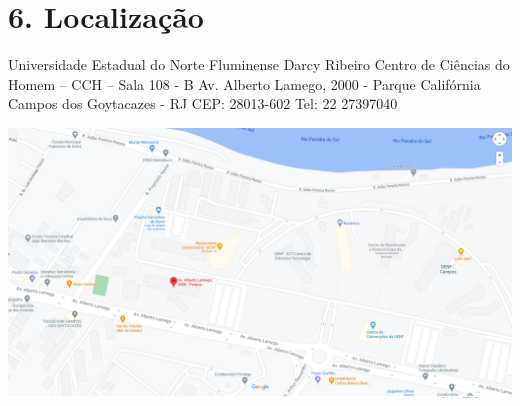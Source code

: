 \documentclass[
  12pt,
]{report}
\begin{document}
\hypertarget{localizauxe7uxe3o}{%
\section{6. Localização}\label{localizauxe7uxe3o}}

Universidade Estadual do Norte Fluminense Darcy Ribeiro \hfill\break
Centro de Ciências do Homem -- CCH -- Sala 108 - B \hfill\break Av.
Alberto Lamego, 2000 - Parque Califórnia \hfill\break Campos dos
Goytacazes - RJ \hfill\break CEP: 28013-602 \hfill\break Tel: 22
27397040 \hfill\break

\href{https://www.google.com.br/maps/place/Av.+Alberto+Lamego,+2000+-+Parque+California,+Campos+dos+Goytacazes+-+RJ,+28013-602/@-21.7618032,-41.2934395,18z/data=!4m5!3m4!1s0xbdd59a0a81985b:0xf4793c8dba9348ac!8m2!3d-21.7623551!4d-41.2946988}{\includegraphics{mapa.png}}
\end{document}
